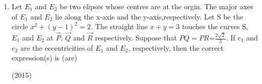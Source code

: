 \begin{enumerate}
		 \begin{multicols}{4}
\begin{enumerate}
			\item$\frac{-1}{r}$
			\item$\frac{1}{r}$
			\item$\frac{2}{r}$
			\item$\frac{2}{r}$
	        \end{enumerate}
\end{multicols}
	\item Let $ E_1$  and $ E_2$ be two elipses whose centres are at the orgin.
              The major axes of $E_1$ and $ E_2$ lie along the x-axis and the
              y-axis,respectively. Let S be the circle $x^2+(y-1)^2=2$. The
		straight line $x+y=3$ touches the curves S, $E_1$ and $E_2$ at $\vec{P}$, $\vec{Q}$
		and $\vec{R}$ respectively. Suppose that $PQ=PR$=$\frac{2\sqrt{2}}{3}$. If $e_1$ and
              $e_2$ are the eccentricities of $E_1$ and $E_2$, respectively, then the 
              correct expression(s) is (are) 
	        
		\hfill(2015)
		

\end{enumerate}
